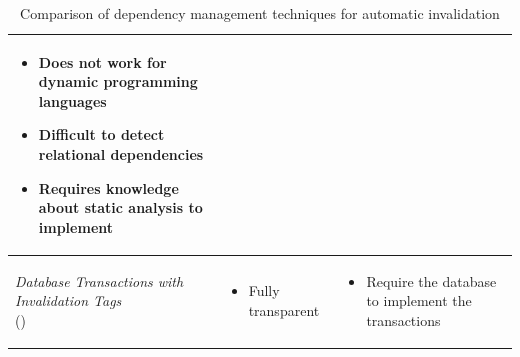 \begin{table}[ht!]
\begin{tabular}{lll}
{{\begin{itemize}[leftmargin=0.75em]
          \item Does not work for dynamic programming languages
          \item Difficult to detect relational dependencies
          \item Requires knowledge about static analysis to implement
        \end{itemize}
      }
    } \\
    \hline
    {
      \parbox{3.5cm}{
        \emph{Database Transactions with Invalidation Tags} \\ (\cite{paper:liskov})
      }
    } & {
      \parbox{3.5cm}{
        \begin{itemize}[leftmargin=0.75em]
          \item Fully transparent
        \end{itemize}
      }
    } & {
      \parbox{3.5cm}{
        \begin{itemize}[leftmargin=0.75em]
          \item Require the database to implement the transactions
        \end{itemize}
      }
    } \\
    \hline
  \end{tabular}
  \caption{Comparison of dependency management techniques for automatic invalidation}
  \label{fig:dependency-management-comparison}
\end{table}





